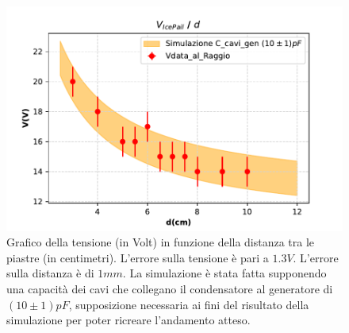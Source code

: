 {\fontsize{12}{14}\selectfont 

\begin{figure}[H]
  \centering
  \includegraphics[width=14cm]{Figures/Grafico_Parte3.pdf}
  \caption{Grafico della tensione (in Volt) in funzione della distanza tra le piastre (in centimetri). L'errore sulla tensione è pari a $1.3V$. L'errore sulla distanza è di $1 mm$. La simulazione è stata fatta supponendo una capacità dei cavi che collegano il condensatore al generatore di $(10 \pm 1)pF$, supposizione necessaria ai fini del risultato della simulazione per poter ricreare l'andamento atteso.}
  \label{fig:GraficoParteIII}
\end{figure}


\par}